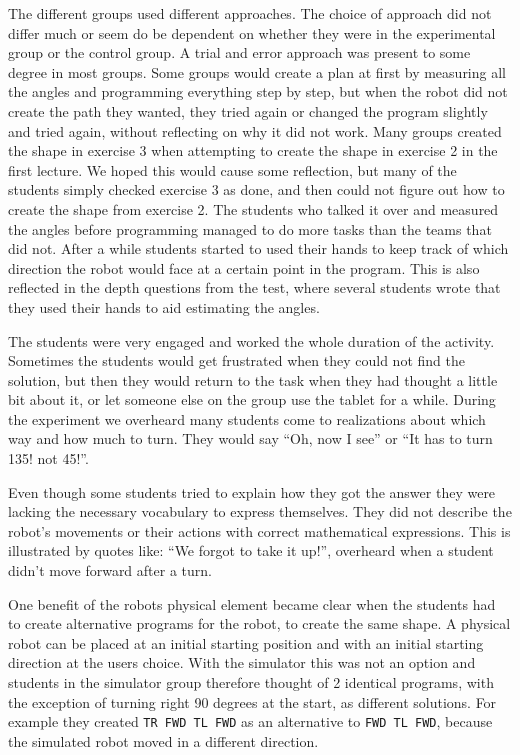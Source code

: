\bigskip\noindent
The different groups used different approaches. The choice of approach did not differ much or seem do be dependent on whether they were in the experimental group or the control group. A trial and error approach was present to some degree in most groups. Some groups would create a plan at first by measuring all the angles and programming everything step by step, but when the robot did not create the path they wanted, they tried again or changed the program slightly and tried again, without reflecting on why it did not work. Many groups created the shape in exercise 3 when attempting to create the shape in exercise 2 in the first lecture. We hoped this would cause some reflection, but many of the students simply checked exercise 3 as done, and then could not figure out how to create the shape from exercise 2. The students who talked it over and measured the angles before programming managed to do more tasks than the teams that did not. After a while students started to used their hands to keep track of which direction the robot would face at a certain point in the program. This is also reflected in the depth questions from the test, where several students wrote that they used their hands to aid estimating the angles.

\bigskip\noindent
The students were very engaged and worked the whole duration of the activity. Sometimes the students would get frustrated when they could not find the solution, but then they would return to the task when they had thought a little bit about it, or let someone else on the group use the tablet for a while. During the experiment we overheard many students come to realizations about which way and how much to turn. They would say ``Oh, now I see'' or ``It has to turn 135! not 45!''. 

\bigskip\noindent
Even though some students tried to explain how they got the answer they were lacking the necessary vocabulary to express themselves. They did not describe the robot's movements or their actions with correct mathematical expressions. This is illustrated by quotes like: ``We forgot to take it up!'', overheard when a student didn't move forward after a turn. 

\bigskip\noindent
One benefit of the robots physical element became clear when the students had to create alternative programs for the robot, to create the same shape. A physical robot can be placed at an initial starting position and with an initial starting direction at the users choice. With the simulator this was not an option and students in the simulator group therefore thought of 2 identical programs, with the exception of turning right 90 degrees at the start, as different solutions. For example they created \texttt{TR FWD TL FWD} as an alternative to \texttt{FWD TL FWD}, because the simulated robot moved in a different direction.

